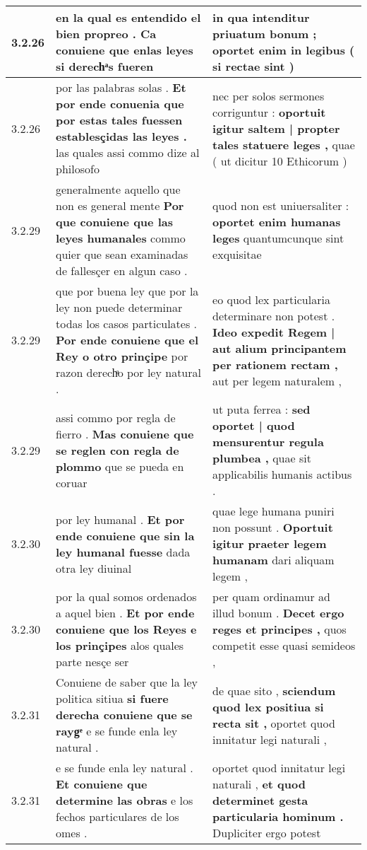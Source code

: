 \begin{tabular}{|p{1cm}|p{6.5cm}|p{6.5cm}|}
3.2.26 & en la qual es entendido el bien propreo . \textbf{ Ca conuiene que enlas leyes } si derechͣs fueren & in qua intenditur priuatum bonum ; \textbf{ oportet enim in legibus } ( si rectae sint ) \\\hline
3.2.26 & por las palabras solas . \textbf{ Et por ende conuenia que por estas tales fuessen establesçidas las leyes . } las quales assi commo dize al philosofo & nec per solos sermones corriguntur : \textbf{ oportuit igitur saltem | propter tales statuere leges , } quae ( ut dicitur 10 Ethicorum ) \\\hline
3.2.29 & generalmente aquello que non es general mente \textbf{ Por que conuiene que las leyes humanales } commo quier que sean examinadas de fallesçer en algun caso . & quod non est uniuersaliter : \textbf{ oportet enim humanas leges } quantumcunque sint exquisitae \\\hline
3.2.29 & que por buena ley que por la ley non puede determinar todas los casos particulates . \textbf{ Por ende conuiene que el Rey o otro prinçipe } por razon derechͣo por ley natural . & eo quod lex particularia determinare non potest . \textbf{ Ideo expedit Regem | aut alium principantem per rationem rectam , } aut per legem naturalem , \\\hline
3.2.29 & assi commo por regla de fierro . \textbf{ Mas conuiene que se reglen con regla de plommo } que se pueda en coruar & ut puta ferrea : \textbf{ sed oportet | quod mensurentur regula plumbea , } quae sit applicabilis humanis actibus . \\\hline
3.2.30 & por ley humanal . \textbf{ Et por ende conuiene que sin la ley humanal fuesse } dada otra ley diuinal & quae lege humana puniri non possunt . \textbf{ Oportuit igitur praeter legem humanam } dari aliquam legem , \\\hline
3.2.30 & por la qual somos ordenados a aquel bien . \textbf{ Et por ende conuiene que los Reyes e los prinçipes } alos quales parte nesçe ser & per quam ordinamur ad illud bonum . \textbf{ Decet ergo reges et principes , } quos competit esse quasi semideos , \\\hline
3.2.31 & Conuiene de saber que la ley politica sitiua \textbf{ si fuere derecha conuiene que se raygͤ } e se funde enla ley natural . & de quae sito , \textbf{ sciendum quod lex positiua si recta sit , } oportet quod innitatur legi naturali , \\\hline
3.2.31 & e se funde enla ley natural . \textbf{ Et conuiene que determine las obras } e los fechos particulares de los omes . & oportet quod innitatur legi naturali , \textbf{ et quod determinet gesta particularia hominum . } Dupliciter ergo potest \\\hline

\end{tabular}
